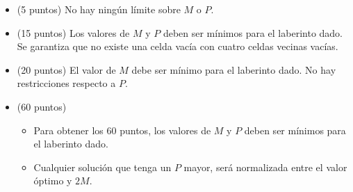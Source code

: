 \documentclass[12pt]{scrartcl}
\begin{document}
    \begin{itemize}
        \item (5 puntos) No hay ningún límite sobre $M$ o $P$.
        \item (15 puntos) Los valores de $M$ y $P$ deben ser mínimos para el laberinto dado. Se garantiza que no existe una celda vacía con cuatro celdas vecinas vacías.
        \item (20 puntos) El valor de $M$ debe ser mínimo para el laberinto dado. No hay restricciones respecto a $P$.
        \item (60 puntos) 
        \begin{itemize}
            \item Para obtener los 60 puntos, los valores de $M$ y $P$ deben ser mínimos para el laberinto dado.
            \item Cualquier solución que tenga un $P$ mayor, será normalizada entre el valor óptimo y $2M$.
        \end{itemize}
    \end{itemize}
\end{document}
